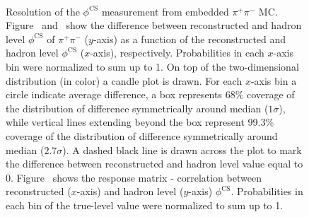 \begin{figure}[h]
{  \centering
  \begin{subfigure}[b]{\linewidth}\addtocounter{subfigure}{-2}\vspace*{-12pt}
  \end{subfigure}\\
    \begin{minipage}[t][1.042\linewidth][t]{\linewidth}\vspace{10pt}
    \caption[Resolution of the $\phi^{\text{CS}}$ measurement from embedded $\pi^{+}\pi^{-}$ MC.]{Resolution of the $\phi^{\text{CS}}$ measurement from embedded $\pi^{+}\pi^{-}$ MC. Figure~ and~ show the difference between reconstructed and hadron level $\phi^{\text{CS}}$ of $\pi^{+}\pi^{-}$ ($y$-axis) as a function of the reconstructed and hadron level $\phi^{\text{CS}}$ ($x$-axis), respectively. Probabilities in each $x$-axis bin were normalized to sum up to 1. On top of the two-dimensional distribution (in color) a candle plot is drawn. For each $x$-axis bin a circle indicate average difference, a box represents 68\% coverage of the distribution of difference symmetrically around median ($1\sigma$), while vertical lines extending beyond the box represent 99.3\% coverage of the distribution of difference symmetrically around median ($2.7\sigma$). A dashed black line is drawn across the plot to mark the difference between reconstructed and hadron level value equal to 0. Figure~ shows the response matrix - correlation between reconstructed ($x$-axis) and hadron level ($y$-axis) $\phi^{\text{CS}}$. Probabilities in each bin of the true-level value were normalized to sum up to 1.}\label{fig:Response_PhiCS}%
  \end{minipage}
}%
\end{figure}




